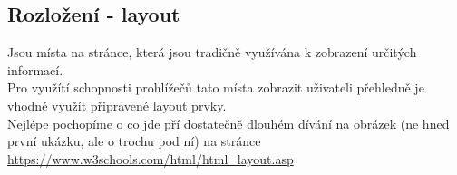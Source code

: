 \subsection{Rozložení - layout}
Jsou místa na stránce, která jsou tradičně využívána k zobrazení určitých informací.\\
Pro využítí schopnosti prohlížečů tato místa zobrazit uživateli přehledně je vhodné využít připravené layout prvky.\\
Nejlépe pochopíme o co jde pří dostatečně dlouhém dívání na obrázek (ne hned první ukázku, ale o trochu pod ní) na stránce \url{https://www.w3schools.com/html/html_layout.asp}






